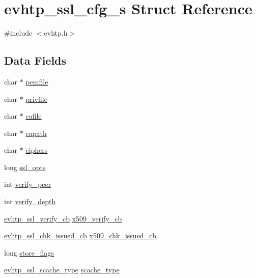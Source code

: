 \hypertarget{structevhtp__ssl__cfg__s}{
\section{evhtp\_\-ssl\_\-cfg\_\-s Struct Reference}
\label{structevhtp__ssl__cfg__s}
}


{\ttfamily \#include $<$evhtp.h$>$}

\subsection*{Data Fields}
\begin{DoxyCompactItemize}
\item 
char $\ast$ \hyperlink{structevhtp__ssl__cfg__s_a166ccef38a88683b0b0896eecb4994e1}{pemfile}
\item 
char $\ast$ \hyperlink{structevhtp__ssl__cfg__s_a316b5f5b982f40f1492e9b732af977f4}{privfile}
\item 
char $\ast$ \hyperlink{structevhtp__ssl__cfg__s_a9ff8d56644bac1d41f8039f2fde5acf2}{cafile}
\item 
char $\ast$ \hyperlink{structevhtp__ssl__cfg__s_a8331a8443119478cd6b1daeb707a94dc}{capath}
\item 
char $\ast$ \hyperlink{structevhtp__ssl__cfg__s_a3e4edb91e89d3cffda8059a32d60e0e8}{ciphers}
\item 
long \hyperlink{structevhtp__ssl__cfg__s_a1132f6a904a8decf77db2cbf4ff14d75}{ssl\_\-opts}
\item 
int \hyperlink{structevhtp__ssl__cfg__s_ae9286c319acb85537c44e2eb86bf546e}{verify\_\-peer}
\item 
int \hyperlink{structevhtp__ssl__cfg__s_af960941c08b45889252b28b3dac628c7}{verify\_\-depth}
\item 
\hyperlink{evhtp_8h_a7bdd701080a9c5b0a97cdc71249bf6ff}{evhtp\_\-ssl\_\-verify\_\-cb} \hyperlink{structevhtp__ssl__cfg__s_afcc514daa3570553ab171826205601c6}{x509\_\-verify\_\-cb}
\item 
\hyperlink{evhtp_8h_ac6f6c53514c631d6ca12885cfc36f930}{evhtp\_\-ssl\_\-chk\_\-issued\_\-cb} \hyperlink{structevhtp__ssl__cfg__s_a886c9bdf3d0ff43ec0ddca4eec2038bf}{x509\_\-chk\_\-issued\_\-cb}
\item 
long \hyperlink{structevhtp__ssl__cfg__s_ad15d9e1280fb922732799e92fa24ba2a}{store\_\-flags}
\item 
\hyperlink{evhtp_8h_ab478739101b89e04a6583b835033f998}{evhtp\_\-ssl\_\-scache\_\-type} \hyperlink{structevhtp__ssl__cfg__s_ae30daad1d680d19dc75f4c29e56b3430}{scache\_\-type}

\end{DoxyCompactItemize}
